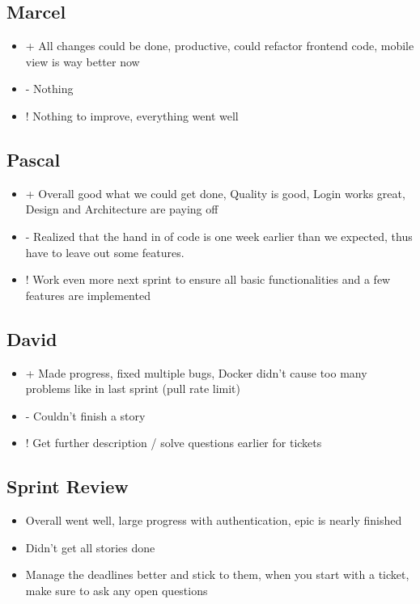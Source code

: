 \subsection{Marcel}
\begin{itemize}
    \item + All changes could be done, productive, could refactor frontend code, mobile view is way better now
    \item - Nothing
    \item ! Nothing to improve, everything went well
\end{itemize}

\subsection{Pascal}
\begin{itemize}
    \item + Overall good what we could get done, Quality is good, Login works great, Design and Architecture are paying off
    \item - Realized that the hand in of code is one week earlier than we expected, thus have to leave out some features.
    \item ! Work even more next sprint to ensure all basic functionalities and a few features are implemented
\end{itemize}

\subsection{David}
\begin{itemize}
    \item + Made progress, fixed multiple bugs, Docker didn't cause too many problems like in last sprint (pull rate limit)
    \item - Couldn't finish a story
    \item ! Get further description / solve questions earlier for tickets
\end{itemize}

\subsection{Sprint Review}
\begin{itemize}
    \item Overall went well, large progress with authentication, epic is nearly finished
    \item Didn't get all stories done
    \item Manage the deadlines better and stick to them, when you start with a ticket, make sure to ask any open questions
\end{itemize}

